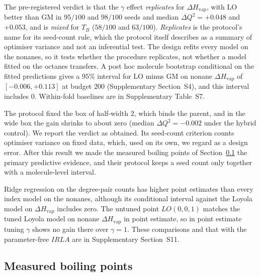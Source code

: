 \documentclass[a5paper, 10pt]{article}
\theoremstyle{plain}
\theoremstyle{remark}
\theoremstyle{definition}
\begin{document}
The pre-registered verdict is that the $\gamma$ effect
\emph{replicates} for $\Delta H_{\mathrm{vap}}$, with LO better than GM
in $95/100$ and $98/100$ seeds and median $\Delta Q^2 = +0.048$ and
$+0.053$, and is \emph{mixed} for $T_B$ ($58/100$ and $63/100$). \emph{Replicates}
is the protocol's name for its seed-count rule, which the protocol
itself describes as a summary of optimiser variance and not an
inferential test. The design refits every model on the nonanes, so it
tests whether the procedure replicates, not whether a model fitted on
the octanes transfers.
A post hoc molecule bootstrap conditional on the fitted predictions gives a
$95\%$ interval for LO minus GM on nonane $\Delta H_{\mathrm{vap}}$ of
$[-0.006, +0.113]$ at budget $200$ (Supplementary Section~S4), and this
interval includes $0$. Within-fold baselines are in Supplementary Table~S7.

The protocol fixed
the box of half-width $2$, which binds the parent, and in the wide box
the gain shrinks to about zero (median $\Delta Q^2 = -0.002$ under the hybrid
control). We report the verdict as obtained. Its seed-count criterion
counts optimiser variance on fixed data, which, used on its own, we
regard as a design error. After this result we made the measured boiling points of
Section~\ref{sec:bp} the primary predictive evidence, and their protocol
keeps a seed count only together with a molecule-level interval.

Ridge regression on the degree-pair counts has higher point estimates than every index model on the nonanes, although its conditional interval against the Loyola model on $\Delta H_{\mathrm{vap}}$ includes zero. The untuned point $LO(0,0,1)$ matches the tuned Loyola model on nonane $\Delta H_{\mathrm{vap}}$ in point estimate, so in point estimate tuning $\gamma$ shows no gain there over $\gamma = 1$. These comparisons and that with the parameter-free $IRLA$ are in Supplementary Section~S11.

\subsection{Measured boiling points}\label{sec:bp}
\end{document}
